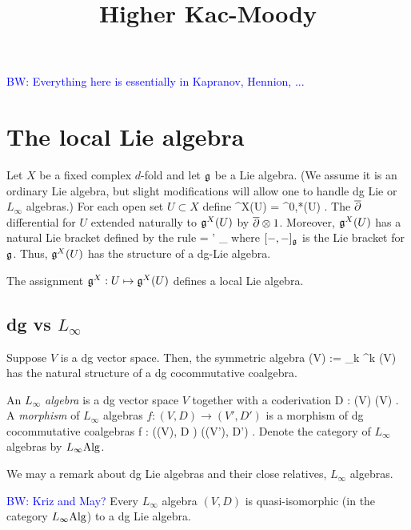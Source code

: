 \documentclass[10pt]{amsart}
\title{Higher Kac-Moody}
\def\brian{\textcolor{blue}{BW: }\textcolor{blue}}
\begin{document}
\maketitle

\brian{Everything here is essentially in Kapranov, Hennion, ...}

\section{The local Lie algebra}

Let $X$ be a fixed complex $d$-fold and let $\mathfrak g$ be a Lie algebra. (We assume it is an ordinary Lie algebra, but slight modifications will allow one to handle dg Lie or $L_\infty$ algebras.) For each open set $U \subset X$ define
\ben
\fg^X(U) = \Omega^{0,*}(U) \tensor \fg .
\een
The $\overline{\partial}$ differential for $U$ extended naturally to $\mathfrak g^X(U)$ by $\overline{\partial} \otimes 1$. Moreover, $\mathfrak g^X(U)$ has a natural Lie bracket defined by the rule
 = \omega \wedge \omega' \tensor [X,X']_\fg
\een
where $[-,-]_\mathfrak g$ is the Lie bracket for $\mathfrak g$. Thus, $\mathfrak g^X(U)$ has the structure of a dg-Lie algebra. 

\begin{lem} The assignment $\mathfrak g^X : U \mapsto \mathfrak g^X(U)$ defines a local Lie algebra. 
\end{lem}

\subsection{dg vs $L_\infty$}

Suppose $V$ is a dg vector space. Then, the symmetric algebra 
\ben
\Sym(V) := \prod_{k} \Sym^{k} (V)
\een
has the natural structure of a dg cocommutative coalgebra.

\def\L8{L_\infty}
\def\Lcat{L_\infty{\rm Alg}}

\begin{dfn} An {\em $L_\infty$ algebra} is a dg vector space $V$ together with a coderivation
\ben
D : \Sym(V) \to \Sym(V) .
\een
A {\em morphism} of $L_\infty$ algebras $f : (V,D) \to (V',D')$ is a morphism of dg cocommutative coalgebras
\ben
f : \left(\Sym(V), D \right) \to \left(\Sym(V'), D'\right) .
\een
Denote the category of $L_\infty$ algebras by $\Lcat$. 
\end{dfn}

We may a remark about dg Lie algebras and their close relatives, $L_\infty$ algebras. 

\begin{thm}\brian{Kriz and May?} Every $L_\infty$ algebra $(V, D)$ is quasi-isomorphic (in the category $\Lcat$) to a dg Lie algebra.
\end{thm}
\end{document}
